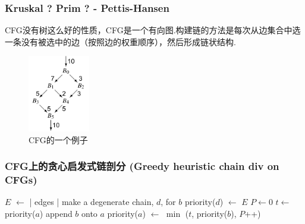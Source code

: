 \begin{frame}[fragile]
    \frametitle{Kruskal ? Prim ? - Pettis-Hansen}

    CFG没有树这么好的性质，CFG是一个有向图.构建链的方法是每次从边集合中选一条没有被选中的边（按照边的权重顺序），然后形成链状结构.

    \begin{figure}
        \centering
        \includegraphics[width=0.24\textwidth]{images/example_cfg.png}
        \caption{CFG的一个例子\cite{cooper2011engineering}}
    \end{figure}



\end{frame}

\begin{frame}
    \frametitle{CFG上的贪心启发式链剖分 (Greedy heuristic chain div on CFGs)}

    \begin{algorithmic}
        \State $E$ $\gets$ | edges |
        \State make a degenerate chain, $d$, for $b$
        \State priority($d$) $\gets$ $E$
        \EndFor
        \State $P \gets 0$
        \State $ t \gets $ priority($a$)
        \State append $b$ onto $a$
        \State priority($a$) $\gets$ $\min$ ($t$, priority($b$), $P$++)
        \EndFor
    \end{algorithmic}


\end{frame}

